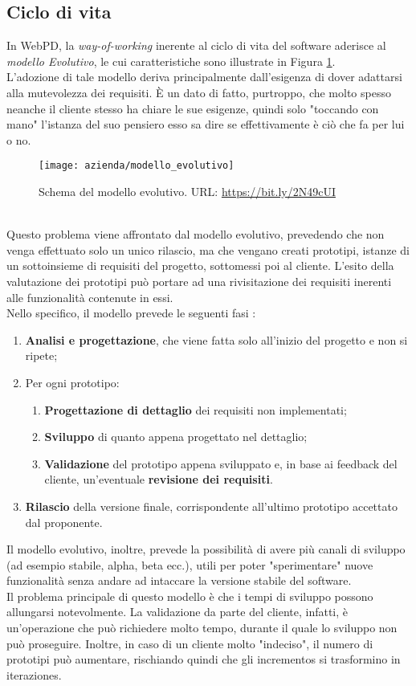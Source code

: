 \subsection{Ciclo di vita}
\label{sec:modello-evolutivo}
In WebPD, la \textit{way-of-working} inerente al ciclo di vita del software aderisce al \textit{modello Evolutivo}, le cui caratteristiche sono illustrate in Figura \ref{figura:modello-evolutivo}.\\
L'adozione di tale modello deriva principalmente dall'esigenza di dover adattarsi alla mutevolezza dei requisiti. È un dato di fatto, purtroppo, che molto spesso neanche il cliente stesso ha chiare le sue esigenze, quindi solo "toccando con mano" l'istanza del suo pensiero esso sa dire se effettivamente è ciò che fa per lui o no.\\
\begin{figure}[!h] 
	\centering 
	\texttt{[image: azienda/modello\_evolutivo]} 
	\caption{Schema del modello evolutivo. URL: \url{https://bit.ly/2N49cUI} }
	\label{figura:modello-evolutivo}
\end{figure}\\
Questo problema viene affrontato dal modello evolutivo, prevedendo che non venga effettuato solo un unico rilascio, ma che vengano creati prototipi, istanze di un sottoinsieme di requisiti del progetto, sottomessi poi al cliente. L'esito della valutazione dei prototipi può portare ad una rivisitazione dei requisiti inerenti alle funzionalità contenute in essi.\\
Nello specifico, il modello prevede le seguenti fasi :
\begin{enumerate}
	\item \textbf{Analisi e progettazione}, che viene fatta solo all'inizio del progetto e non si ripete;
	\item Per ogni prototipo:
		\begin{enumerate}
			\item \textbf{Progettazione di dettaglio} dei requisiti non implementati;
			\item \textbf{Sviluppo} di quanto appena progettato nel dettaglio;
			\item \textbf{Validazione} del prototipo appena sviluppato e, in base ai feedback del cliente, un'eventuale \textbf{revisione dei requisiti}.
		\end{enumerate}
	\item \textbf{Rilascio} della versione finale, corrispondente all'ultimo prototipo accettato dal proponente.
\end{enumerate}
Il modello evolutivo, inoltre, prevede la possibilità di avere più canali di sviluppo (ad esempio stabile, alpha, beta ecc.), utili per poter "sperimentare" nuove funzionalità senza andare ad intaccare la versione stabile del software.\\
Il problema principale di questo modello è che i tempi di sviluppo possono allungarsi notevolmente. La validazione da parte del cliente, infatti, è un'operazione che può richiedere molto tempo, durante il quale lo sviluppo non può proseguire. Inoltre, in caso di un cliente molto "indeciso", il numero di prototipi può aumentare, rischiando quindi che gli \glspl{incremento} si trasformino in \glspl{iterazione}.

